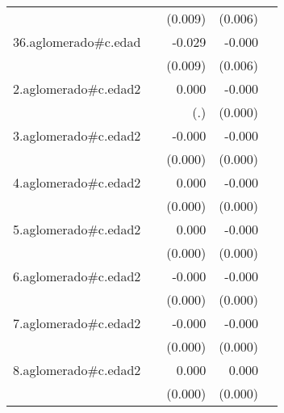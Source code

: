 {\begin{longtable}{l*{4}{D{.}{.}{-1}}}
            &                     &     (0.009)         &     (0.006)         &                     \\
\addlinespace
36.aglomerado#c.edad&                     &      -0.029\sym{***}&      -0.000         &                     \\
            &                     &     (0.009)         &     (0.006)         &                     \\
\addlinespace
2.aglomerado#c.edad2&                     &       0.000         &      -0.000\sym{*}  &                     \\
            &                     &         (.)         &     (0.000)         &                     \\
\addlinespace
3.aglomerado#c.edad2&                     &      -0.000         &      -0.000\sym{***}&                     \\
            &                     &     (0.000)         &     (0.000)         &                     \\
\addlinespace
4.aglomerado#c.edad2&                     &       0.000         &      -0.000         &                     \\
            &                     &     (0.000)         &     (0.000)         &                     \\
\addlinespace
5.aglomerado#c.edad2&                     &       0.000         &      -0.000         &                     \\
            &                     &     (0.000)         &     (0.000)         &                     \\
\addlinespace
6.aglomerado#c.edad2&                     &      -0.000         &      -0.000\sym{***}&                     \\
            &                     &     (0.000)         &     (0.000)         &                     \\
\addlinespace
7.aglomerado#c.edad2&                     &      -0.000         &      -0.000         &                     \\
            &                     &     (0.000)         &     (0.000)         &                     \\
\addlinespace
8.aglomerado#c.edad2&                     &       0.000\sym{***}&       0.000\sym{**} &                     \\
            &                     &     (0.000)         &     (0.000)         &                     \\

\end{longtable}}
